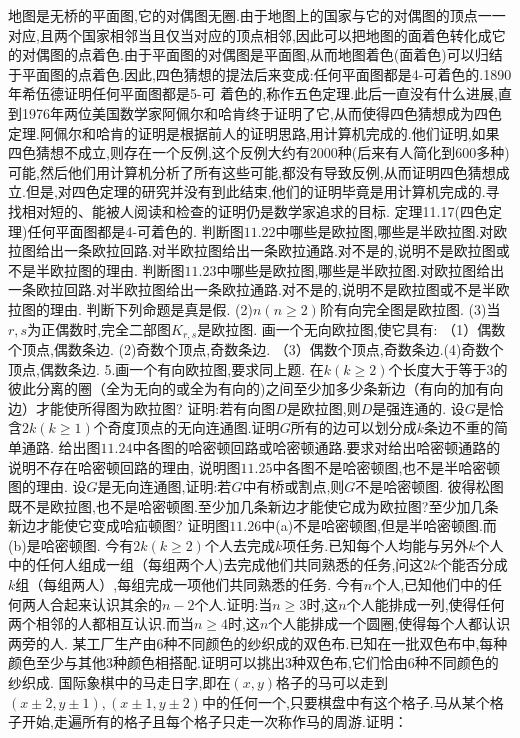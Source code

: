 地图是无桥的平面图,它的对偶图无圈.由于地图上的国家与它的对偶图的顶点一一对应,且两个国家相邻当且仅当对应的顶点相邻,因此可以把地图的面着色转化成它的对偶图的点着色.由于平面图的对偶图是平面图,从而地图着色(面着色)可以归结于平面图的点着色.因此,四色猜想的提法后来变成:任何平面图都是4-可着色的.1890年希伍德证明任何平面图都是5-可
着色的,称作五色定理.此后一直没有什么进展,直到1976年两位美国数学家阿佩尔和哈肯终于证明了它,从而使得四色猜想成为四色定理.阿佩尔和哈肯的证明是根据前人的证明思路,用计算机完成的.他们证明,如果四色猜想不成立,则存在一个反例,这个反例大约有2000种(后来有人简化到600多种)可能,然后他们用计算机分析了所有这些可能,都没有导致反例,从而证明四色猜想成立.但是,对四色定理的研究并没有到此结束,他们的证明毕竟是用计算机完成的.寻找相对短的、能被人阅读和检查的证明仍是数学家追求的目标.
定理11.17(四色定理)任何平面图都是4-可着色的.
判断图$11.22$中哪些是欧拉图,哪些是半欧拉图.对欧拉图给出一条欧拉回路.对半欧拉图给出一条欧拉通路.对不是的,说明不是欧拉图或不是半欧拉图的理由.
判断图$11.23$中哪些是欧拉图,哪些是半欧拉图.对欧拉图给出一条欧拉回路.对半欧拉图给出一条欧拉通路.对不是的,说明不是欧拉图或不是半欧拉图的理由.
判断下列命题是真是假.
(2)$n(n\geqslant2)$阶有向完全图是欧拉图.
(3)当$r,s$为正偶数时,完全二部图$K_{r,s}$是欧拉图.
画一个无向欧拉图,使它具有:
（1）偶数个顶点,偶数条边.
(2)奇数个顶点,奇数条边.
（3）偶数个顶点,奇数条边.(4)奇数个顶点,偶数条边.
5.画一个有向欧拉图,要求同上题.
在$k(k\geqslant2)$个长度大于等于3的彼此分离的圈（全为无向的或全为有向的)之间至少加多少条新边（有向的加有向边）才能使所得图为欧拉图?
证明:若有向图$D$是欧拉图,则$D$是强连通的.
设$G$是恰含$2k(k\geqslant1)$个奇度顶点的无向连通图.证明$G$所有的边可以划分成$k$条边不重的简单通路.
给出图$11.24$中各图的哈密顿回路或哈密顿通路.要求对给出哈密顿通路的说明不存在哈密顿回路的理由,
说明图$11.25$中各图不是哈密顿图,也不是半哈密顿图的理由.
设$G$是无向连通图,证明:若$G$中有桥或割点,则$G$不是哈密顿图.
彼得松图既不是欧拉图,也不是哈密顿图.至少加几条新边才能使它成为欧拉图?至少加几条新边才能使它变成哈疝顿图?
证明图$11.26$中(a)不是哈密顿图,但是半哈密顿图.而(b)是哈密顿图.
今有$2k(k\geqslant2)$个人去完成$k$项任务.已知每个人均能与另外$k$个人中的任何人组成一组（每组两个人)去完成他们共同熟悉的任务,问这$2k$个能否分成$k$组（每组两人）,每组完成一项他们共同熟悉的任务.
今有$n$个人,已知他们中的任何两人合起来认识其余的$n-2$个人.证明:当$n\geqslant3$时,这$n$个人能排成一列,使得任何两个相邻的人都相互认识.而当$n\geqslant4$时,这$n$个人能排成一个圆圈,使得每个人都认识两旁的人.
某工厂生产由6种不同颜色的纱织成的双色布.已知在一批双色布中,每种颜色至少与其他3种颜色相搭配.证明可以挑出3种双色布,它们恰由6种不同颜色的纱织成.
国际象棋中的马走日字,即在$(x,y)$格子的马可以走到$(x\pm2,y\pm1),(x\pm1,y\pm2)$中的任何一个,只要棋盘中有这个格子.马从某个格子开始,走遍所有的格子且每个格子只走一次称作马的周游.证明：
